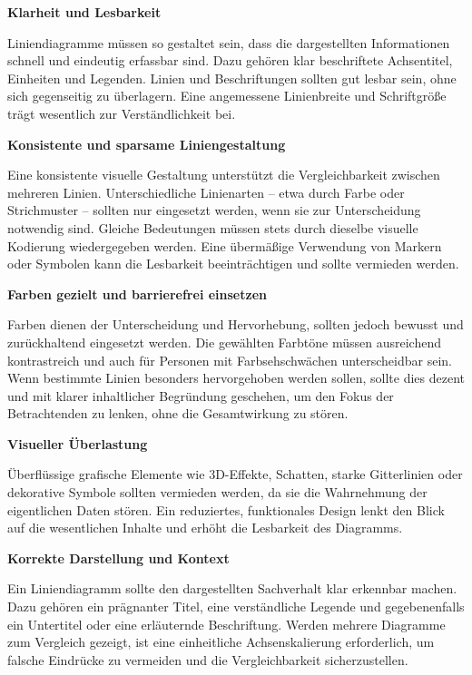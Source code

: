 \item
\textbf{Klarheit und Lesbarkeit}

Liniendiagramme müssen so gestaltet sein, dass die dargestellten Informationen schnell und eindeutig erfassbar sind.
Dazu gehören klar beschriftete Achsentitel, Einheiten und Legenden.
Linien und Beschriftungen sollten gut lesbar sein, ohne sich gegenseitig zu überlagern.
Eine angemessene Linienbreite und Schriftgröße trägt wesentlich zur Verständlichkeit bei.

\item
\textbf{Konsistente und sparsame Liniengestaltung}

Eine konsistente visuelle Gestaltung unterstützt die Vergleichbarkeit zwischen mehreren Linien.
Unterschiedliche Linienarten – etwa durch Farbe oder Strichmuster – sollten nur eingesetzt werden, wenn sie zur Unterscheidung notwendig sind.
Gleiche Bedeutungen müssen stets durch dieselbe visuelle Kodierung wiedergegeben werden. Eine übermäßige Verwendung von Markern oder Symbolen kann die Lesbarkeit beeinträchtigen und sollte vermieden werden.

\item
\textbf{Farben gezielt und barrierefrei einsetzen}

Farben dienen der Unterscheidung und Hervorhebung, sollten jedoch bewusst und zurückhaltend eingesetzt werden.
Die gewählten Farbtöne müssen ausreichend kontrastreich und auch für Personen mit Farbsehschwächen unterscheidbar sein.
Wenn bestimmte Linien besonders hervorgehoben werden sollen, sollte dies dezent und mit klarer inhaltlicher Begründung geschehen, um den Fokus der Betrachtenden zu lenken, ohne die Gesamtwirkung zu stören.

\item
\textbf{Visueller Überlastung}

Überflüssige grafische Elemente wie 3D-Effekte, Schatten, starke Gitterlinien oder dekorative Symbole sollten vermieden werden, da sie die Wahrnehmung der eigentlichen Daten stören.
Ein reduziertes, funktionales Design lenkt den Blick auf die wesentlichen Inhalte und erhöht die Lesbarkeit des Diagramms.

\item
\textbf{Korrekte Darstellung und Kontext}

Ein Liniendiagramm sollte den dargestellten Sachverhalt klar erkennbar machen.
Dazu gehören ein prägnanter Titel, eine verständliche Legende und gegebenenfalls ein Untertitel oder eine erläuternde Beschriftung.
Werden mehrere Diagramme zum Vergleich gezeigt, ist eine einheitliche Achsenskalierung erforderlich, um falsche Eindrücke zu vermeiden und die Vergleichbarkeit sicherzustellen.

